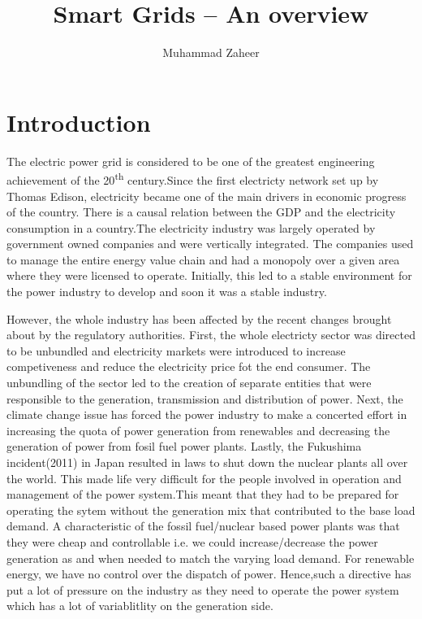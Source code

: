 \documentclass[11pt,a4paper]{article}
\begin{document}
\author{Muhammad Zaheer}
\title{Smart Grids -- An overview}
\maketitle

\section{Introduction}
The electric power grid is considered to be one of the greatest engineering achievement of the 20\textsuperscript{th} century.Since the first electricty network set up by Thomas Edison, electricity became one of the main drivers in economic progress of the country. There is a causal relation between the GDP and the electricity consumption in a country\cite{Jumbe200461}.The electricity industry was largely operated by government owned companies and were vertically integrated. The companies used to manage the entire energy value chain and had a monopoly over a given area where they were licensed to operate. Initially, this led to a stable environment for the power industry to develop and soon it was a stable industry.

However, the whole industry has been affected by the recent changes brought about by the regulatory authorities. First, the whole electricty sector was directed to be unbundled and electricity markets were introduced to increase competiveness and reduce the electricity price fot the end consumer. The unbundling of the sector led to the creation of separate entities that were responsible to the generation, transmission and distribution of power. Next, the climate change issue has forced the power industry to make a concerted effort in increasing the quota of power generation from renewables and decreasing the generation of power from fosil fuel power plants. Lastly, the Fukushima incident(2011) in Japan resulted in laws to shut down the nuclear plants all over the world. This made life very difficult for the people involved in operation and management of the power system.This meant that they had to be prepared for operating the sytem without the generation mix that contributed to the base load demand.  A characteristic of the fossil fuel/nuclear based power plants was that they were cheap and controllable i.e. we could increase/decrease the power generation as and when needed to match the varying load demand. For renewable energy, we have no control over the dispatch of power. Hence,such a directive has put a lot of pressure on the industry as they need to operate the power system which has a lot of variablitlity on the generation side.
\end{document}
